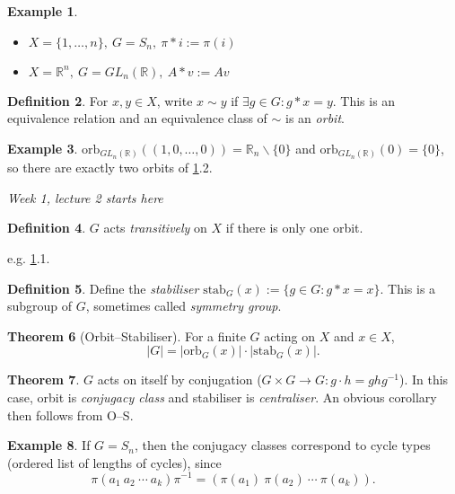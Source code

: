 \documentclass{article}
\newcommand{\R}{\mathbb{R}}
\newcommand{\orb}{\text{orb}}
\newcommand{\stab}{\text{stab}}
\theoremstyle{definition}
\newtheorem{defn}{Definition}[subsection]
\newtheorem{thm}[defn]{Theorem}
\newtheorem{example}[defn]{Example}
\begin{document}
\begin{example}
\label{example:gpact}
\begin{itemize}
\item $X=\{1,\ldots,n\},\ G=S_n,\ \pi\ast i:=\pi(i)$
\item $X=\R^n,\ G=GL_n(\R),\ A\ast v:=Av$
\end{itemize}
\end{example}

\begin{defn}
For $x,y\in X$, write $x\sim y$ if $\exists g\in G:g\ast x=y$. This is an equivalence relation and an equivalence class of $\sim$ is an \textit{orbit}.
\end{defn}

\begin{example}
$\orb_{GL_n(\R)}((1,0,\ldots,0))=\mathbb R_n\backslash\{0\}$ and $\orb_{GL_n(\R)}(0)=\{0\}$, so there are exactly two orbits of \ref{example:gpact}.2.
\end{example}

\begin{flushright}
\textit{Week 1, lecture 2 starts here}
\end{flushright}

\begin{defn}
$G$ acts \textit{transitively} on $X$ if there is only one orbit.
\end{defn}
e.g. \ref{example:gpact}.1.

\begin{defn}
Define the \textit{stabiliser} $\stab_G(x):=\{g\in G:g\ast x=x\}$. This is a subgroup of $G$, sometimes called \textit{symmetry group}.
\end{defn}

\begin{thm}[Orbit–Stabiliser]
For a finite $G$ acting on $X$ and $x\in X$,
\[
|G|=|\orb_G(x)|\cdot |\stab_G(x)|.
\]
\end{thm}

\begin{thm}
$G$ acts on itself by conjugation ($G\times G\rightarrow G:g\cdot h=ghg^{-1}$). In this case, orbit is \textit{conjugacy class} and stabiliser is \textit{centraliser}. An obvious corollary then follows from O–S.
\end{thm}

\begin{example}
\label{example:Snconjclas}
If $G=S_n$, then the conjugacy classes correspond to cycle types (ordered list of lengths of cycles), since
\[
\pi (a_1\ a_2\ \cdots \ a_k)\pi^{-1}=(\pi(a_1) \ \pi(a_2) \ \cdots \ \pi(a_k)).
\]
\end{example}
\end{document}
